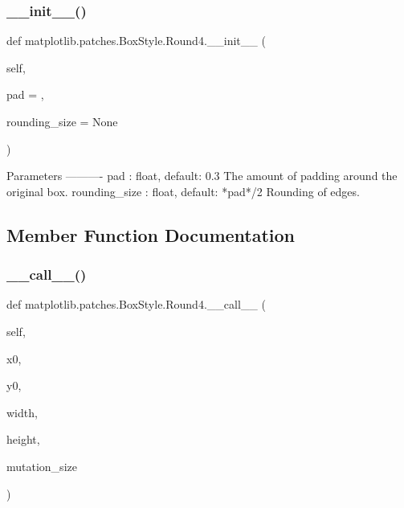 \subsubsection{\texorpdfstring{\+\_\+\+\_\+init\+\_\+\+\_\+()}{\_\_init\_\_()}}
{\footnotesize\ttfamily def matplotlib.\+patches.\+Box\+Style.\+Round4.\+\_\+\+\_\+init\+\_\+\+\_\+ (\begin{DoxyParamCaption}\item[{}]{self,  }\item[{}]{pad = {},  }\item[{}]{rounding\+\_\+size = {\ttfamily None} }\end{DoxyParamCaption})}

\begin{DoxyVerb}Parameters
----------
pad : float, default: 0.3
    The amount of padding around the original box.
rounding_size : float, default: *pad*/2
    Rounding of edges.
\end{DoxyVerb}
 

\subsection{Member Function Documentation}
\mbox{\label{classmatplotlib_1_1patches_1_1BoxStyle_1_1Round4_ac0624cabb04a379265bd6e0ae83aa7ef}} 
\subsubsection{\texorpdfstring{\+\_\+\+\_\+call\+\_\+\+\_\+()}{\_\_call\_\_()}}
{\footnotesize\ttfamily def matplotlib.\+patches.\+Box\+Style.\+Round4.\+\_\+\+\_\+call\+\_\+\+\_\+ (\begin{DoxyParamCaption}\item[{}]{self,  }\item[{}]{x0,  }\item[{}]{y0,  }\item[{}]{width,  }\item[{}]{height,  }\item[{}]{mutation\+\_\+size }\end{DoxyParamCaption})}



